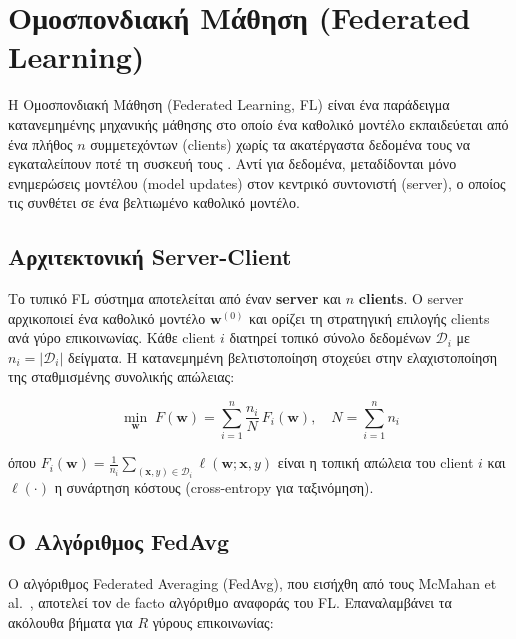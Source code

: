 
\section{Ομοσπονδιακή Μάθηση (Federated Learning)}
\label{sec:federated_learning}

Η Ομοσπονδιακή Μάθηση (Federated Learning, FL) είναι ένα παράδειγμα
κατανεμημένης μηχανικής μάθησης στο οποίο ένα καθολικό μοντέλο
εκπαιδεύεται από ένα πλήθος $n$ συμμετεχόντων (clients) χωρίς τα
ακατέργαστα δεδομένα τους να εγκαταλείπουν ποτέ τη συσκευή τους
\cite{McMahan2017}. Αντί για δεδομένα, μεταδίδονται μόνο ενημερώσεις
μοντέλου (model updates) στον κεντρικό συντονιστή (server), ο οποίος
τις συνθέτει σε ένα βελτιωμένο καθολικό μοντέλο.

\subsection{Αρχιτεκτονική Server-Client}
\label{subsec:fl_architecture}

Το τυπικό FL σύστημα αποτελείται από έναν \textbf{server} και $n$
\textbf{clients}. Ο server αρχικοποιεί ένα καθολικό μοντέλο
$\mathbf{w}^{(0)}$ και ορίζει τη στρατηγική επιλογής clients ανά γύρο
επικοινωνίας. Κάθε client $i$ διατηρεί τοπικό σύνολο δεδομένων
$\mathcal{D}_i$ με $n_i = |\mathcal{D}_i|$ δείγματα. Η κατανεμημένη
βελτιστοποίηση στοχεύει στην ελαχιστοποίηση της σταθμισμένης συνολικής
απώλειας:

\begin{equation}
    \label{eq:fl_objective}
    \min_{\mathbf{w}} \; F(\mathbf{w}) = \sum_{i=1}^{n}
    \frac{n_i}{N} \, F_i(\mathbf{w}), \quad N = \sum_{i=1}^{n} n_i
\end{equation}

\noindent όπου $F_i(\mathbf{w}) = \frac{1}{n_i}\sum_{(\mathbf{x},y)
\in \mathcal{D}_i} \ell(\mathbf{w}; \mathbf{x}, y)$ είναι η τοπική
απώλεια του client $i$ και $\ell(\cdot)$ η συνάρτηση κόστους
(cross-entropy για ταξινόμηση).

\subsection{Ο Αλγόριθμος FedAvg}
\label{subsec:fedavg}

Ο αλγόριθμος Federated Averaging (FedAvg), που εισήχθη από τους McMahan
et al.\ \cite{McMahan2017}, αποτελεί τον de facto αλγόριθμο αναφοράς
του FL. Επαναλαμβάνει τα ακόλουθα βήματα για $R$ γύρους επικοινωνίας:


